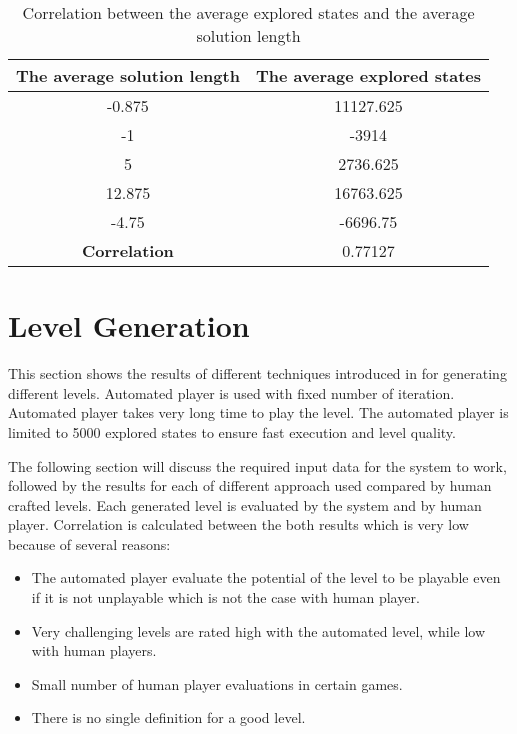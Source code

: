 \begin{table}[!ht]
	\centering
	\begin{tabular}{|c|c|}
		\hline
		\textbf{The average solution length} & \textbf{The average explored states}\\
		\hline
		-0.875 & 11127.625\\
		\hline
		-1 & -3914\\
		\hline
		5 & 2736.625\\
		\hline
		12.875 & 16763.625\\
		\hline
		-4.75 & -6696.75\\
		\hline
		\textbf{Correlation} & 0.77127\\
		\hline
	\end{tabular}
	\caption{Correlation between the average explored states and the average solution length}
	\label{Table:playerCorrelation}
\end{table}

\section{Level Generation}
This section shows the results of different techniques introduced in  for generating different levels. Automated player is used with fixed number of iteration. Automated player takes very long time to play the level. The automated player is limited to 5000 explored states to ensure fast execution and level quality.\\\par

The following section will discuss the required input data for the system to work, followed by the results for each of different approach used compared by human crafted levels. Each generated level is evaluated by the system and by human player. Correlation is calculated between the both results which is very low because of several reasons:
\begin{itemize} \itemsep0pt \parskip0pt 
	\item The automated player evaluate the potential of the level to be playable even if it is not unplayable which is not the case with human player. 
	\item Very challenging levels are rated high with the automated level, while low with human players.
	\item Small number of human player evaluations in certain games.
	\item There is no single definition for a good level.
\end{itemize}

